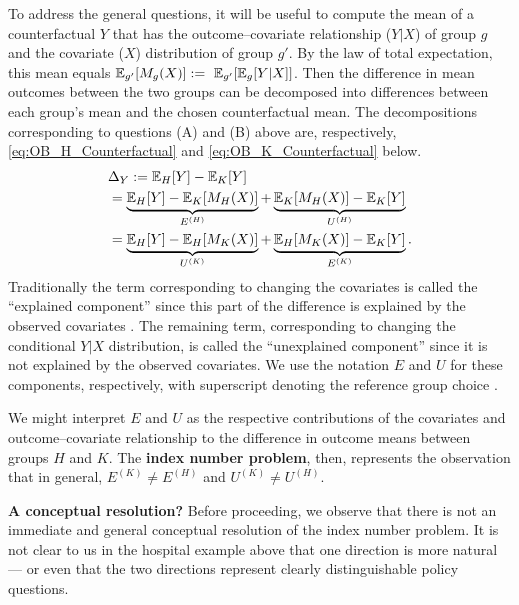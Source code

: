 To address the general questions, it will be useful to compute the mean of a counterfactual $Y$ that has the outcome--covariate relationship ($Y|X$) of group $g$ and the covariate ($X$) distribution of group $g'$. By the law of total expectation, this mean equals
$\mathbb{E}_{g'} [ M_g(X) ] := \ \mathbb{E}_{g'} [ \mathbb{E}_g  [ Y | X ] ]$.
Then the difference in mean outcomes between the two groups can be decomposed into differences between each group's mean
and the chosen counterfactual mean. The decompositions corresponding to questions (A) and (B) above are, respectively, 
\cref{eq:OB_H_Counterfactual} and \cref{eq:OB_K_Counterfactual} below.
%
\begin{align}
	\nonumber
    &\Delta_Y := \mathbb{E}_H[Y] - \mathbb{E}_K[Y] \\ 
    \label{eq:OB_H_Counterfactual}
    &=\underbrace{\mathbb{E}_H[Y] - \mathbb{E}_{K} [ M_H(X) ] }_{E^{(H)}} 
     + \underbrace{\mathbb{E}_{K} [ M_H(X) ] - \mathbb{E}_K[Y]}_{U^{(H)} } \\
     \label{eq:OB_K_Counterfactual}
     &=\underbrace{\mathbb{E}_H[Y] - \mathbb{E}_{H} [ M_K(X) ] }_{U^{(K)}} 
     + \underbrace{\mathbb{E}_{H} [ M_K(X) ] - \mathbb{E}_K[Y] }_{E^{(K)}}.
\end{align} 
%
Traditionally the term corresponding to changing the covariates is called the
``explained component'' since this part of the difference is explained by the observed
covariates \citep{fortinLemieuxFirpo2011}. The remaining term, corresponding to changing the conditional $Y|X$ distribution,
is called the ``unexplained component'' since it is not explained by the observed covariates. We use the 
notation $E$ and $U$ for these components, respectively, with superscript denoting 
the reference group choice \cite{fortinLemieuxFirpo2011}.

We might interpret $E$ and $U$ as the respective contributions of the covariates and outcome--covariate relationship to the 
difference in outcome means between groups $H$ and $K$. The \textbf{index number problem}, then, represents the observation
that in general, $E^{(K)} \neq E^{(H)}$ and $U^{(K)} \neq U^{(H)}$.

\textbf{A conceptual resolution?}
Before proceeding, we observe that there is not an immediate and general conceptual resolution of the index number problem.
It is not clear to us in the hospital example above that one direction is more natural --- or even that the two directions represent clearly distinguishable policy questions.

